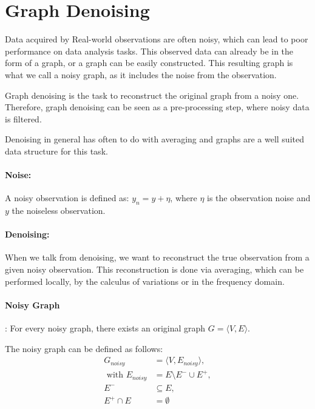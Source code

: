 \section{Graph Denoising}
Data acquired by Real-world observations are often noisy, which can lead to poor 
performance on data analysis tasks. This observed data can already be in the form of a graph,
or a graph can be easily constructed. This resulting graph is what we call
a noisy graph, as it includes the noise from the observation.

Graph denoising is the task to reconstruct the original graph from a noisy one.
Therefore, graph denoising can be seen as a pre-processing step, where noisy data is filtered.

Denoising in general has often to do with averaging 
 and graphs are a well suited data structure for this task\cite{noneLocalMean}.

\paragraph{Noise:}
A noisy observation is defined as:
$y_n = y + \eta$, where $\eta$ is the observation noise and $y$ the noiseless observation.

\paragraph{Denoising:}
When we talk from denoising, we want to reconstruct the true observation 
from a given noisy observation. 
This reconstruction is done via averaging, which can be performed
locally, by the calculus of variations or in the frequency domain\cite{noneLocalMean}.

\paragraph{Noisy Graph}:
For every noisy graph, there exists an original graph $G = \langle V,E \rangle$.

The noisy graph can be defined as follows:
\begin{equation}
    \begin{aligned}
        G_{noisy} &= \langle V,E_{noisy} \rangle,  \\ 
        \text{ with }  E_{noisy} &= E \setminus  E^{-} \cup  E^{+}, \\ 
         E^{-} & \subseteq E, \\
         E^{+} \cap E &= \emptyset
    \end{aligned}
\end{equation}

